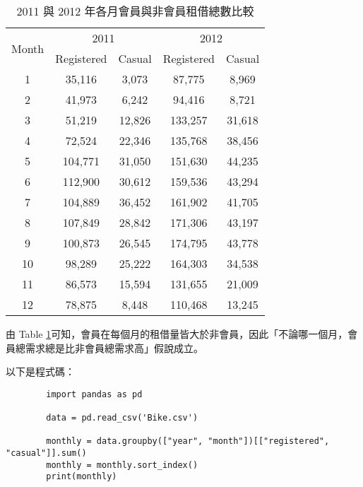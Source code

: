 \documentclass[12pt,a4paper]{article}
\begin{document}
\begin{enumerate}
\begin{enumerate}
        \begin{table}[h]
        \centering
        \begin{tabular}{c cc cc}
        \toprule
        \multirow{2}{*}{Month} & \multicolumn{2}{c}{2011} & \multicolumn{2}{c}{2012} \\
        \cmidrule(lr){2-3} \cmidrule(lr){4-5}
        & Registered & Casual & Registered & Casual \\
        \midrule
        1  &  35,116 &  3,073 &  87,775 &  8,969 \\
        2  &  41,973 &  6,242 &  94,416 &  8,721 \\
        3  &  51,219 & 12,826 & 133,257 & 31,618 \\
        4  &  72,524 & 22,346 & 135,768 & 38,456 \\
        5  & 104,771 & 31,050 & 151,630 & 44,235 \\
        6  & 112,900 & 30,612 & 159,536 & 43,294 \\
        7  & 104,889 & 36,452 & 161,902 & 41,705 \\
        8  & 107,849 & 28,842 & 171,306 & 43,197 \\
        9  & 100,873 & 26,545 & 174,795 & 43,778 \\
        10 &  98,289 & 25,222 & 164,303 & 34,538 \\
        11 &  86,573 & 15,594 & 131,655 & 21,009 \\
        12 &  78,875 &  8,448 & 110,468 & 13,245 \\
        \bottomrule
        \end{tabular}
        \caption{2011 與 2012 年各月會員與非會員租借總數比較}
        \label{tab:year_month}
        \end{table}

        由 Table \ref{tab:year_month}可知，會員在每個月的租借量皆大於非會員，因此「不論哪一個月，會員總需求總是比非會員總需求高」假說成立。
        
        以下是程式碼：

        \begin{verbatim}
        import pandas as pd

        data = pd.read_csv('Bike.csv')

        monthly = data.groupby(["year", "month"])[["registered", "casual"]].sum()
        monthly = monthly.sort_index()
        print(monthly)

        \end{verbatim}


\end{enumerate}
\end{enumerate}
\end{document}
